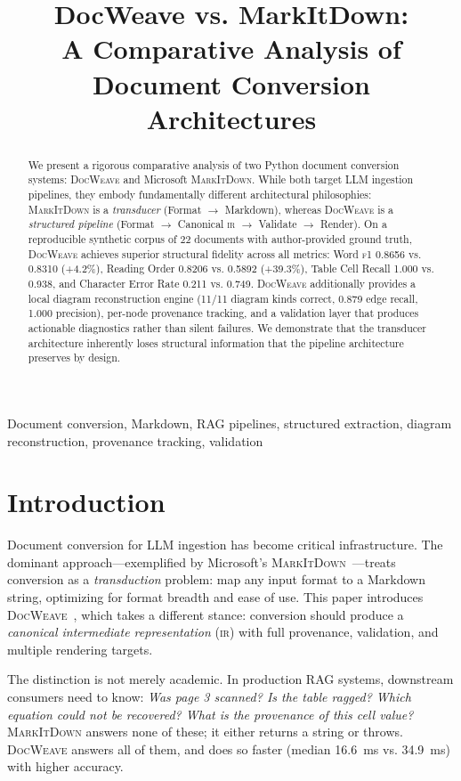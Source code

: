 \documentclass[10pt, conference, compsocconf]{IEEEtran}
\title{DocWeave vs. MarkItDown:\\ A Comparative Analysis of Document Conversion Architectures}
\author{
    \IEEEauthorblockN{Oliver Jude}
    \IEEEauthorblockA{
        \textit{oliver.jude1011@gmail.com}\\
        \textit{https://github.com/OSkywalker101/Docweave.git}
    }
}
\theoremstyle{plain}
\newcommand{\docweave}{\textsc{DocWeave}}
\newcommand{\markitdown}{\textsc{MarkItDown}}
\newcommand{\ir}{\textsc{ir}}
\newcommand{\fone}{\textsc{f1}}
\begin{document}
\maketitle

\begin{abstract}
We present a rigorous comparative analysis of two Python document conversion systems: \docweave{} and Microsoft \markitdown{}. While both target LLM ingestion pipelines, they embody fundamentally different architectural philosophies: \markitdown{} is a \textit{transducer} (Format $\to$ Markdown), whereas \docweave{} is a \textit{structured pipeline} (Format $\to$ Canonical \ir{} $\to$ Validate $\to$ Render). On a reproducible synthetic corpus of 22 documents with author-provided ground truth, \docweave{} achieves superior structural fidelity across all metrics: Word \fone{} 0.8656 vs. 0.8310 (+4.2\%), Reading Order 0.8206 vs. 0.5892 (+39.3\%), Table Cell Recall 1.000 vs. 0.938, and Character Error Rate 0.211 vs. 0.749. \docweave{} additionally provides a local diagram reconstruction engine (11/11 diagram kinds correct, 0.879 edge recall, 1.000 precision), per-node provenance tracking, and a validation layer that produces actionable diagnostics rather than silent failures. We demonstrate that the transducer architecture inherently loses structural information that the pipeline architecture preserves by design.
\end{abstract}

\begin{IEEEkeywords}
Document conversion, Markdown, RAG pipelines, structured extraction, diagram reconstruction, provenance tracking, validation
\end{IEEEkeywords}

\section{Introduction}
\label{sec:intro}

Document conversion for LLM ingestion has become critical infrastructure. The dominant approach---exemplified by Microsoft's \markitdown{}~\cite{markitdown}---treats conversion as a \textit{transduction} problem: map any input format to a Markdown string, optimizing for format breadth and ease of use. This paper introduces \docweave{}~\cite{docweave}, which takes a different stance: conversion should produce a \textit{canonical intermediate representation} (\ir{}) with full provenance, validation, and multiple rendering targets.

The distinction is not merely academic. In production RAG systems, downstream consumers need to know: \textit{Was page 3 scanned? Is the table ragged? Which equation could not be recovered? What is the provenance of this cell value?} \markitdown{} answers none of these; it either returns a string or throws. \docweave{} answers all of them, and does so faster (median 16.6~ms vs. 34.9~ms) with higher accuracy.
\end{document}
